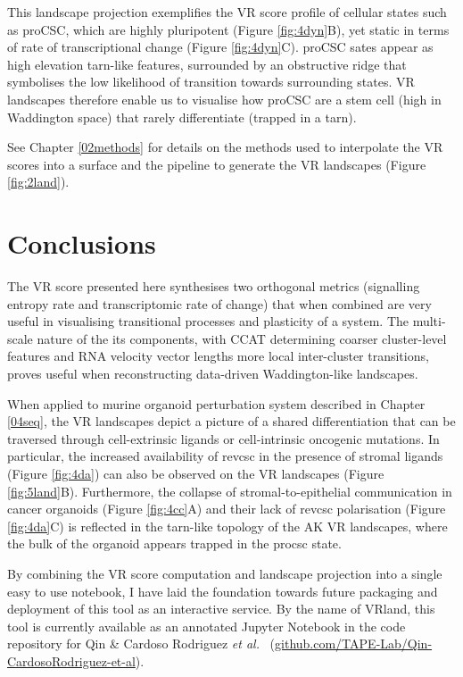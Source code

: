 This landscape projection exemplifies the VR score profile of cellular states such as proCSC, which are highly pluripotent (Figure \ref{fig:4dyn}B), yet static in terms of rate of transcriptional change (Figure \ref{fig:4dyn}C). proCSC sates appear as high elevation tarn-like features, surrounded by an obstructive ridge that symbolises the low likelihood of transition towards surrounding states. VR landscapes therefore enable us to visualise how proCSC are a stem cell (high in Waddington space) that rarely differentiate (trapped in a tarn). 

See Chapter \ref{02methods} for details on the methods used to interpolate the VR scores into a surface and the pipeline to generate the VR landscapes (Figure \ref{fig:2land}).

\newpage
\section{Conclusions}

The VR score presented here synthesises two orthogonal metrics (signalling entropy rate and transcriptomic rate of change) that when combined are very useful in visualising transitional processes and plasticity of a system. The multi-scale nature of the its components, with CCAT determining coarser cluster-level features and RNA velocity vector lengths more local inter-cluster transitions, proves useful when reconstructing data-driven Waddington-like landscapes. 

When applied to murine organoid perturbation system described in Chapter \ref{04seq}, the VR landscapes depict a picture of a shared differentiation that can be traversed through cell-extrinsic ligands or cell-intrinsic oncogenic mutations. In particular, the increased availability of \acrshort{revcsc} in the presence of stromal ligands (Figure \ref{fig:4da}) can also be observed on the VR landscapes (Figure \ref{fig:5land}B). Furthermore, the collapse of stromal-to-epithelial communication in cancer organoids (Figure \ref{fig:4cc}A) and their lack of \acrshort{revcsc} polarisation (Figure \ref{fig:4da}C) is reflected in the tarn-like topology of the AK VR landscapes, where the bulk of the organoid appears trapped in the \acrshort{procsc} state.

By combining the VR score computation and landscape projection into a single easy to use notebook, I have laid the foundation towards future packaging and deployment of this tool as an interactive service. By the name of VRland, this tool is currently available as an annotated Jupyter Notebook in the code repository for Qin \& Cardoso Rodriguez \emph{et al.}~\cite{cardoso_rodriguez_single-cell_2023} (\href{www.github.com/TAPE-Lab/Qin-CardosoRodriguez-et-al}{github.com/TAPE-Lab/Qin-CardosoRodriguez-et-al}).
